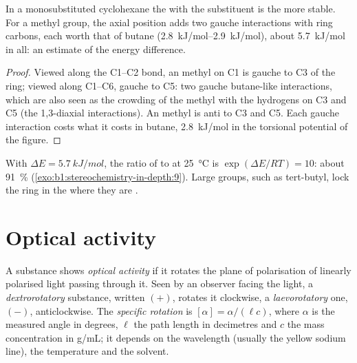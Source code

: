 \begin{proposition}\label{prop:b1:stereochemistry-in-depth:chair-substituent}
In a monosubstituted cyclohexane the  with the substituent
 is the more stable. For a methyl group, the axial position adds
two gauche interactions with ring carbons, each worth that of butane
(\qtyrange{2.8}{2.9}{kJ/mol}), about \qty{5.7}{kJ/mol} in all: an estimate
of the energy difference.
\end{proposition}

\begin{proof}
Viewed along the C1--C2 bond, an  methyl on C1 is gauche to C3 of
the ring; viewed along C1--C6, gauche to C5: two gauche butane-like
interactions, which are also seen as the crowding of the methyl with the
 hydrogens on C3 and C5 (the 1,3-diaxial interactions). An
 methyl is anti to C3 and C5. Each gauche interaction costs
what it costs in butane, \qty{2.8}{kJ/mol} in the torsional potential of
the figure.
\end{proof}

With $\Delta E = \qty{5.7}{kJ/mol}$, the ratio of  to 
 at \qty{25}{\celsius} is $\exp(\Delta E/RT) = 10$: about
\qty{91}{\percent}  (\cref{exo:b1:stereochemistry-in-depth:9}).
Large groups, such as tert-butyl, lock the ring in the  where they
are .

\section{Optical activity}

\begin{definition}\label{def:b1:stereochemistry-in-depth:optical-activity}
A substance shows \emph{optical activity} if it
rotates the plane of polarisation of linearly polarised light passing
through it. Seen by an observer facing the light, a
\emph{dextrorotatory} substance, written $(+)$,
rotates it clockwise, a \emph{laevorotatory} one,
$(-)$, anticlockwise. The \emph{specific rotation}
is $[\alpha] = \alpha/(\ell c)$, where $\alpha$ is the measured
angle in degrees, $\ell$ the path length in decimetres and $c$ the mass
concentration in \unit{g/mL}; it depends on the wavelength (usually the
yellow sodium line), the temperature and the solvent.
\end{definition}

